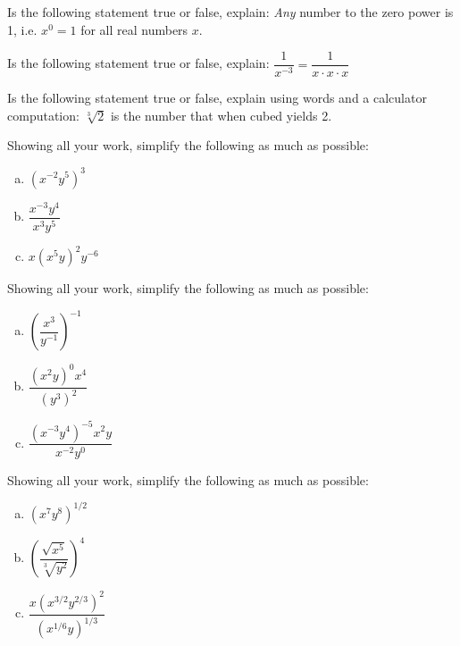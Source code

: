 \documentclass[11pt,letterpaper]{article}
\begin{document}

 Is the following statement true or false, explain: \textit{Any} number to the zero power is 1, i.e. $x^0= 1$ for all real numbers $x$. 



\newpage



 Is the following statement true or false, explain: $\dfrac{1}{x^{-3}}= \dfrac{1}{x \cdot x \cdot x}$



\newpage



 Is the following statement true or false, explain using words and a calculator computation: $\sqrt[3]{2}$ is the number that when cubed yields 2. 



\newpage



 Showing all your work, simplify the following as much as possible:
\begin{enumerate}[(a)]
\item $(x^{-2} y^5)^3$
\item $\dfrac{x^{-3}y^4}{x^3y^5}$
\item $x(x^5y)^2y^{-6}$
\end{enumerate}



\newpage



 Showing all your work, simplify the following as much as possible:
\begin{enumerate}[(a)]
\item $\left( \dfrac{x^3}{y^{-1}} \right)^{-1}$
\item $\dfrac{(x^2y)^0 x^4}{(y^3)^2}$
\item $\dfrac{(x^{-3} y^4)^{-5} x^2y}{x^{-2} y^0}$
\end{enumerate}



\newpage



 Showing all your work, simplify the following as much as possible:
\begin{enumerate}[(a)]
\item $(x^7 y^8)^{1/2}$
\item $\left( \dfrac{\sqrt{x^5}}{\sqrt[3]{y^2}} \right)^4$
\item $\dfrac{x(x^{3/2}y^{2/3})^2}{(x^{1/6}y)^{1/3}}$
\end{enumerate}
\end{document}
